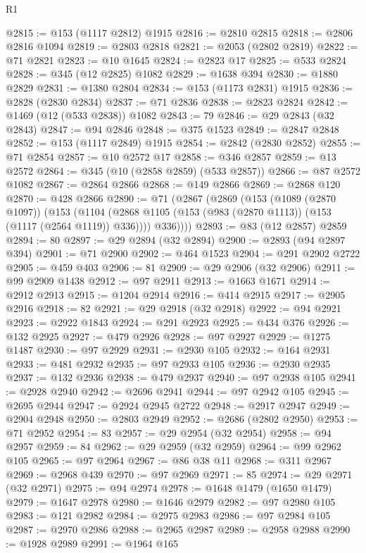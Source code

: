 \begin{lexlean}{R1}
\begin{coremodule}
@2815 := @153 (@1117 @2812) @1915
@2816 := @2810 @2815
@2818 := @2806 @2816 @1094
@2819 := @2803 @2818
@2821 := @2053 (@2802 @2819)
@2822 := @71 @2821
@2823 := @10 @1645
@2824 := @2823 @17
@2825 := @533 @2824
@2828 := @345 (@12 @2825) @1082
@2829 := @1638 @394
@2830 := @1880 @2829
@2831 := @1380 @2804
@2834 := @153 (@1173 @2831) @1915
@2836 := @2828 (@2830 @2834)
@2837 := @71 @2836
@2838 := @2823 @2824
@2842 := @1469 (@12 (@533 @2838)) @1082
@2843 := 79
@2846 := @29 @2843 (@32 @2843)
@2847 := @94 @2846
@2848 := @375 @1523
@2849 := @2847 @2848
@2852 := @153 (@1117 @2849) @1915
@2854 := @2842 (@2830 @2852)
@2855 := @71 @2854
@2857 := @10 @2572 @17
@2858 := @346 @2857
@2859 := @13 @2572
@2864 := @345 (@10 (@2858 @2859) (@533 @2857))
@2866 := @87 @2572 @1082
@2867 := @2864 @2866
@2868 := @149 @2866
@2869 := @2868 @120
@2870 := @428 @2866
@2890 := @71
    (@2867
      (@2869
        (@153
          (@1089 (@2870 @1097))
          (@153
            (@1104 (@2868 @1105 (@153 (@983 (@2870 @1113)) (@153 (@1117 (@2564 @1119)) @336))))
            @336))))
@2893 := @83 (@12 @2857) @2859
@2894 := 80
@2897 := @29 @2894 (@32 @2894)
@2900 := @2893 (@94 @2897 @394)
@2901 := @71 @2900
@2902 := @464 @1523
@2904 := @291 @2902 @2722
@2905 := @459 @403
@2906 := 81
@2909 := @29 @2906 (@32 @2906)
@2911 := @99 @2909 @1438
@2912 := @97 @2911
@2913 := @1663 @1671
@2914 := @2912 @2913
@2915 := @1204 @2914
@2916 := @414 @2915
@2917 := @2905 @2916
@2918 := 82
@2921 := @29 @2918 (@32 @2918)
@2922 := @94 @2921
@2923 := @2922 @1843
@2924 := @291 @2923
@2925 := @434 @376
@2926 := @132 @2925
@2927 := @479 @2926
@2928 := @97 @2927
@2929 := @1275 @1487
@2930 := @97 @2929
@2931 := @2930 @105
@2932 := @164 @2931
@2933 := @481 @2932
@2935 := @97 @2933 @105
@2936 := @2930 @2935
@2937 := @132 @2936
@2938 := @479 @2937
@2940 := @97 @2938 @105
@2941 := @2928 @2940
@2942 := @2696 @2941
@2944 := @97 @2942 @105
@2945 := @2695 @2944
@2947 := @2924 @2945 @2722
@2948 := @2917 @2947
@2949 := @2904 @2948
@2950 := @2803 @2949
@2952 := @2686 (@2802 @2950)
@2953 := @71 @2952
@2954 := 83
@2957 := @29 @2954 (@32 @2954)
@2958 := @94 @2957
@2959 := 84
@2962 := @29 @2959 (@32 @2959)
@2964 := @99 @2962 @105
@2965 := @97 @2964
@2967 := @86 @38 @11
@2968 := @311 @2967
@2969 := @2968 @439
@2970 := @97 @2969
@2971 := 85
@2974 := @29 @2971 (@32 @2971)
@2975 := @94 @2974
@2978 := @1648 @1479 (@1650 @1479)
@2979 := @1647 @2978
@2980 := @1646 @2979
@2982 := @97 @2980 @105
@2983 := @121 @2982
@2984 := @2975 @2983
@2986 := @97 @2984 @105
@2987 := @2970 @2986
@2988 := @2965 @2987
@2989 := @2958 @2988
@2990 := @1928 @2989
@2991 := @1964 @165

\end{coremodule}
\end{lexlean}
